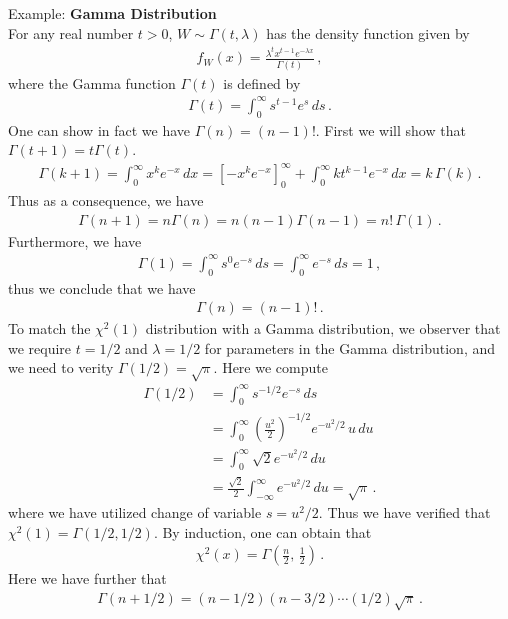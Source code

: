 \documentclass[11pt, onesided]{book}
\theoremstyle{break}
\theoremstyle{break}
\newcommand{\example}{\color{green}Example: \color{black}}
\begin{document}
\example \textbf{Gamma Distribution}\\
For any real number $t > 0$, $W\sim \Gamma(t,\lambda) $ has the density function given by
\begin{align*}
f_W(x) =\frac{\lambda^t x^{t-1} e^{-\lambda x}}{\Gamma(t)}\,,
\end{align*}
where the Gamma function $\Gamma(t)$ is defined by
\begin{align*}
\Gamma(t) = \int_0^{\infty} s^{t-1} e^s\, ds\,.
\end{align*}
One can show in fact we have $\Gamma(n) = (n-1)!$. First we will show that $\Gamma(t+1) = t \Gamma(t)$. 
\begin{align*}
\Gamma(k+1) = \int_0^{\infty}x^{k}e^{-x}\, dx = \left[-x^k e^{-x}\right]^\infty_0 + \int_0^\infty kt^{k-1}e^{-x}\, dx = k\,\Gamma(k)\,.
\end{align*}
Thus as a consequence, we have
\begin{align*}
\Gamma(n+1) = n \Gamma(n) = n(n-1) \Gamma(n-1) = n!\, \Gamma(1)\,.
\end{align*}
Furthermore, we have
\begin{align*}
\Gamma(1) = \int_0^\infty s^0 e^{-s}\, ds = \int_0^\infty e^{-s}\, ds = 1\,,
\end{align*}
thus we conclude that we have
\begin{align*}
\Gamma(n) = (n-1)!\,.
\end{align*}
To match the $\chi^2(1)$ distribution with a Gamma distribution, we observer that we require $t=1/2$ and $\lambda = 1/2$ for parameters in the Gamma distribution, and we need to verity $\Gamma(1/2) = \sqrt{\pi}$. Here we compute
\begin{align*}
\Gamma(1/2) &= \int_0^{\infty}s^{-1/2} e^{-s}\, ds \\
&= \int_0^\infty \left( \frac{u^2}{2}\right)^{-1/2} e^{-u^2/2}\, u\, du \\
&= \int_0^\infty \sqrt{2}e^{-u^2/2} \, du \\
&= \frac{\sqrt{2}}{2}\int_{-\infty}^\infty e^{-u^2/2}\, du = \sqrt{\pi}\,.
\end{align*}
where we have utilized change of variable $s = u^2/2$. Thus we have verified that $\chi^2(1) = \Gamma(1/2, 1/2)$. By induction, one can obtain that
\begin{align*}
\chi^2(x) = \Gamma\left( \frac{n}{2},\, \frac{1}{2}\right)\,.
\end{align*}
Here we have further that
\begin{align*}
\Gamma(n+1/2) = (n-1/2)(n-3/2)\cdots(1/2)\sqrt{\pi}\,.
\end{align*}
\end{document}
